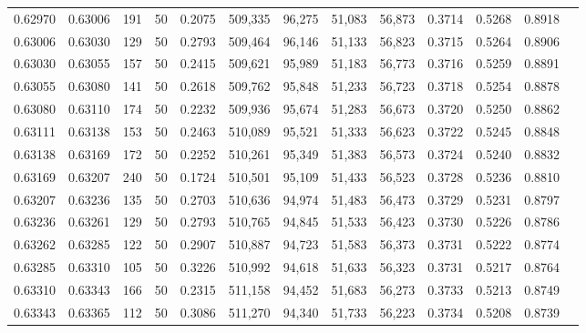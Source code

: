 \begin{tabular}{rrrrrrrrrrrrr}
0.62970 & 0.63006 &   191 &  50 &                                     0.2075 & 509,335 &  96,275 &  51,083 &  56,873 & 0.3714 & 0.5268 & 0.8918 \\
0.63006 & 0.63030 &   129 &  50 &                                     0.2793 & 509,464 &  96,146 &  51,133 &  56,823 & 0.3715 & 0.5264 & 0.8906 \\
0.63030 & 0.63055 &   157 &  50 &                                     0.2415 & 509,621 &  95,989 &  51,183 &  56,773 & 0.3716 & 0.5259 & 0.8891 \\
0.63055 & 0.63080 &   141 &  50 &                                     0.2618 & 509,762 &  95,848 &  51,233 &  56,723 & 0.3718 & 0.5254 & 0.8878 \\
0.63080 & 0.63110 &   174 &  50 &                                     0.2232 & 509,936 &  95,674 &  51,283 &  56,673 & 0.3720 & 0.5250 & 0.8862 \\
0.63111 & 0.63138 &   153 &  50 &                                     0.2463 & 510,089 &  95,521 &  51,333 &  56,623 & 0.3722 & 0.5245 & 0.8848 \\
0.63138 & 0.63169 &   172 &  50 &                                     0.2252 & 510,261 &  95,349 &  51,383 &  56,573 & 0.3724 & 0.5240 & 0.8832 \\
0.63169 & 0.63207 &   240 &  50 &                                     0.1724 & 510,501 &  95,109 &  51,433 &  56,523 & 0.3728 & 0.5236 & 0.8810 \\
0.63207 & 0.63236 &   135 &  50 &                                     0.2703 & 510,636 &  94,974 &  51,483 &  56,473 & 0.3729 & 0.5231 & 0.8797 \\
0.63236 & 0.63261 &   129 &  50 &                                     0.2793 & 510,765 &  94,845 &  51,533 &  56,423 & 0.3730 & 0.5226 & 0.8786 \\
0.63262 & 0.63285 &   122 &  50 &                                     0.2907 & 510,887 &  94,723 &  51,583 &  56,373 & 0.3731 & 0.5222 & 0.8774 \\
0.63285 & 0.63310 &   105 &  50 &                                     0.3226 & 510,992 &  94,618 &  51,633 &  56,323 & 0.3731 & 0.5217 & 0.8764 \\
0.63310 & 0.63343 &   166 &  50 &                                     0.2315 & 511,158 &  94,452 &  51,683 &  56,273 & 0.3733 & 0.5213 & 0.8749 \\
0.63343 & 0.63365 &   112 &  50 &                                     0.3086 & 511,270 &  94,340 &  51,733 &  56,223 & 0.3734 & 0.5208 & 0.8739 \\

\end{tabular}
